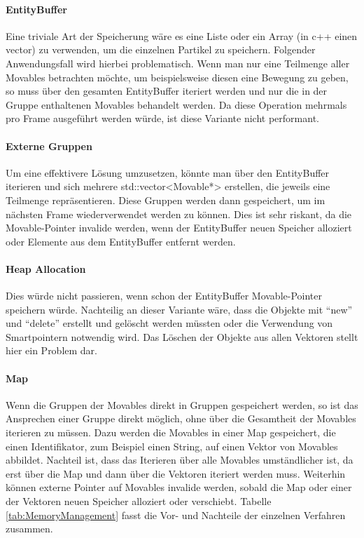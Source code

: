\documentclass[11pt,a4paper]{article}
\begin{document}
\paragraph{EntityBuffer}
Eine triviale Art der Speicherung wäre es eine Liste oder ein Array (in c++ einen vector) zu verwenden, um die einzelnen Partikel zu speichern. Folgender Anwendungsfall wird hierbei problematisch. Wenn man nur eine Teilmenge aller Movables betrachten möchte, um beispielsweise diesen eine Bewegung zu geben, so muss über den gesamten EntityBuffer iteriert werden und nur die in der Gruppe enthaltenen Movables behandelt werden. Da diese Operation mehrmals pro Frame ausgeführt werden würde, ist diese Variante nicht performant.
\paragraph{Externe Gruppen}
Um eine effektivere Lösung umzusetzen, könnte man über den EntityBuffer iterieren und sich mehrere std::vector<Movable*> erstellen, die jeweils eine Teilmenge repräsentieren. Diese Gruppen werden dann gespeichert, um im nächsten Frame wiederverwendet werden zu können. Dies ist sehr riskant, da die Movable-Pointer invalide werden, wenn der EntityBuffer neuen Speicher alloziert oder Elemente aus dem EntityBuffer entfernt werden.
\paragraph{Heap Allocation}
Dies würde nicht passieren, wenn schon der EntityBuffer Movable-Pointer speichern würde. Nachteilig an dieser Variante wäre, dass die Objekte mit ``new'' und ``delete'' erstellt und gelöscht werden müssten oder die Verwendung von Smartpointern notwendig wird. Das Löschen der Objekte aus allen Vektoren stellt hier ein Problem dar.
\paragraph{Map}
Wenn die Gruppen der Movables direkt in Gruppen gespeichert werden, so ist das Ansprechen einer Gruppe direkt möglich, ohne über die Gesamtheit der Movables iterieren zu müssen. Dazu werden die Movables in einer Map gespeichert, die einen Identifikator, zum Beispiel einen String, auf einen Vektor von Movables abbildet. Nachteil ist, dass das Iterieren über alle Movables umständlicher ist, da erst über die Map und dann über die Vektoren iteriert werden muss. Weiterhin können externe Pointer auf Movables invalide werden, sobald die Map oder einer der Vektoren neuen Speicher alloziert oder verschiebt. Tabelle \ref{tab:MemoryManagement} fasst die Vor- und Nachteile der einzelnen Verfahren zusammen.
\end{document}
